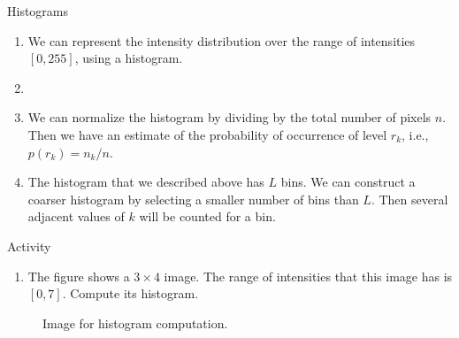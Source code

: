 \begin{frame}{Histograms}
    \begin{enumerate}
      \item We can represent the intensity distribution over the range of intensities $[0,255]$, using a histogram.

    \item {}

    \item We can normalize the histogram by dividing by the total number of pixels $n$. Then we have an estimate of the probability of occurrence of level $r_k$, i.e., $p(r_k) = n_k/n$.

    \item The histogram that we described above has $L$ bins. We can construct a coarser histogram by selecting a smaller number of bins than $L$. Then several adjacent values of $k$ will be counted for a bin.

    \end{enumerate}
\end{frame}

\begin{frame}{Activity}
    \begin{enumerate}
      \item The figure shows a $3\times 4$ image. The range of intensities that this image has is $[0,7]$. Compute its histogram.
    \end{enumerate}
        \begin{figure}
          \centering
            
          \caption{Image for histogram computation.}
        \end{figure}

\end{frame}


